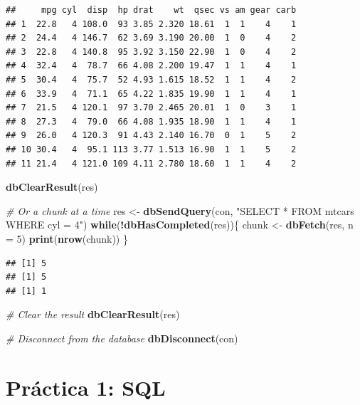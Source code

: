 \documentclass[
]{book}
\newenvironment{Shaded}{\begin{snugshade}}{\end{snugshade}}
\newcommand{\AttributeTok}[1]{\textcolor[rgb]{0.13,0.29,0.53}{#1}}
\newcommand{\CommentTok}[1]{\textcolor[rgb]{0.56,0.35,0.01}{\textit{#1}}}
\newcommand{\ControlFlowTok}[1]{\textcolor[rgb]{0.13,0.29,0.53}{\textbf{#1}}}
\newcommand{\DecValTok}[1]{\textcolor[rgb]{0.00,0.00,0.81}{#1}}
\newcommand{\FunctionTok}[1]{\textcolor[rgb]{0.13,0.29,0.53}{\textbf{#1}}}
\newcommand{\NormalTok}[1]{#1}
\newcommand{\OtherTok}[1]{\textcolor[rgb]{0.56,0.35,0.01}{#1}}
\newcommand{\SpecialCharTok}[1]{\textcolor[rgb]{0.81,0.36,0.00}{\textbf{#1}}}
\newcommand{\StringTok}[1]{\textcolor[rgb]{0.31,0.60,0.02}{#1}}
\begin{document}
\begin{verbatim}
##     mpg cyl  disp  hp drat    wt  qsec vs am gear carb
## 1  22.8   4 108.0  93 3.85 2.320 18.61  1  1    4    1
## 2  24.4   4 146.7  62 3.69 3.190 20.00  1  0    4    2
## 3  22.8   4 140.8  95 3.92 3.150 22.90  1  0    4    2
## 4  32.4   4  78.7  66 4.08 2.200 19.47  1  1    4    1
## 5  30.4   4  75.7  52 4.93 1.615 18.52  1  1    4    2
## 6  33.9   4  71.1  65 4.22 1.835 19.90  1  1    4    1
## 7  21.5   4 120.1  97 3.70 2.465 20.01  1  0    3    1
## 8  27.3   4  79.0  66 4.08 1.935 18.90  1  1    4    1
## 9  26.0   4 120.3  91 4.43 2.140 16.70  0  1    5    2
## 10 30.4   4  95.1 113 3.77 1.513 16.90  1  1    5    2
## 11 21.4   4 121.0 109 4.11 2.780 18.60  1  1    4    2
\end{verbatim}

\begin{Shaded}
\begin{Highlighting}[]
\FunctionTok{dbClearResult}\NormalTok{(res)}

\CommentTok{\# Or a chunk at a time}
\NormalTok{res }\OtherTok{\textless{}{-}} \FunctionTok{dbSendQuery}\NormalTok{(con, }\StringTok{"SELECT * FROM mtcars WHERE cyl = 4"}\NormalTok{)}
\ControlFlowTok{while}\NormalTok{(}\SpecialCharTok{!}\FunctionTok{dbHasCompleted}\NormalTok{(res))\{}
\NormalTok{  chunk }\OtherTok{\textless{}{-}} \FunctionTok{dbFetch}\NormalTok{(res, }\AttributeTok{n =} \DecValTok{5}\NormalTok{)}
  \FunctionTok{print}\NormalTok{(}\FunctionTok{nrow}\NormalTok{(chunk))}
\NormalTok{\}}
\end{Highlighting}
\end{Shaded}

\begin{verbatim}
## [1] 5
## [1] 5
## [1] 1
\end{verbatim}

\begin{Shaded}
\begin{Highlighting}[]
\CommentTok{\# Clear the result}
\FunctionTok{dbClearResult}\NormalTok{(res)}

\CommentTok{\# Disconnect from the database}
\FunctionTok{dbDisconnect}\NormalTok{(con)}
\end{Highlighting}
\end{Shaded}

\section{Práctica 1: SQL}\label{pruxe1ctica-1-sql}
\end{document}
